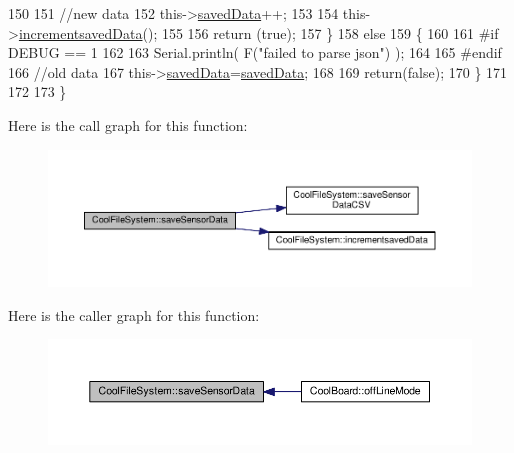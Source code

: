 \begin{DoxyCode}
150 
151         \textcolor{comment}{//new data}
152         this->\hyperlink{class_cool_file_system_ad9f5b739a32100f5f21270c3d9ee2b1d}{savedData}++;
153 
154         this->\hyperlink{class_cool_file_system_aae045125288f255f3e258073dcada2a6}{incrementsavedData}();
155         
156         \textcolor{keywordflow}{return} (\textcolor{keyword}{true});      
157     \}
158     \textcolor{keywordflow}{else}
159     \{
160     
161 \textcolor{preprocessor}{    #if DEBUG == 1}
162 
163         Serial.println( F(\textcolor{stringliteral}{"failed to parse json"}) );
164     
165 \textcolor{preprocessor}{    #endif}
166         \textcolor{comment}{//old data}
167         this->\hyperlink{class_cool_file_system_ad9f5b739a32100f5f21270c3d9ee2b1d}{savedData}=\hyperlink{class_cool_file_system_ad9f5b739a32100f5f21270c3d9ee2b1d}{savedData};
168 
169         \textcolor{keywordflow}{return}(\textcolor{keyword}{false});
170     \}
171     
172 
173 \}
\end{DoxyCode}
Here is the call graph for this function\+:\nopagebreak
\begin{figure}[H]
\begin{center}
\leavevmode
\includegraphics[width=350pt]{db/d0c/class_cool_file_system_afa3a4feae94871d4d3b6bebb701c2e67_cgraph}
\end{center}
\end{figure}
Here is the caller graph for this function\+:\nopagebreak
\begin{figure}[H]
\begin{center}
\leavevmode
\includegraphics[width=350pt]{db/d0c/class_cool_file_system_afa3a4feae94871d4d3b6bebb701c2e67_icgraph}
\end{center}
\end{figure}
\mbox{\label{class_cool_file_system_ab78704d5d21ce10fc6f1138ab5ab46c8}} 
